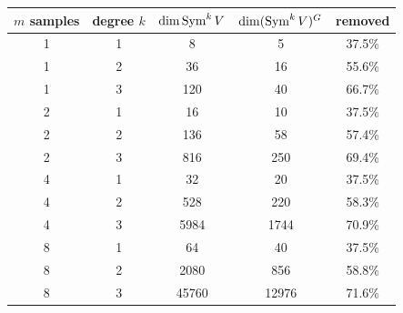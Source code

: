\begin{tabular}{ccccc}
\toprule
$m$ samples & degree $k$ & $\dim\operatorname{Sym}^k V$ & $\dim(\operatorname{Sym}^k V)^G$ & removed \\
\midrule
  1 & 1 & 8 & 5 & 37.5\% \\
  1 & 2 & 36 & 16 & 55.6\% \\
  1 & 3 & 120 & 40 & 66.7\% \\
  2 & 1 & 16 & 10 & 37.5\% \\
  2 & 2 & 136 & 58 & 57.4\% \\
  2 & 3 & 816 & 250 & 69.4\% \\
  4 & 1 & 32 & 20 & 37.5\% \\
  4 & 2 & 528 & 220 & 58.3\% \\
  4 & 3 & 5984 & 1744 & 70.9\% \\
  8 & 1 & 64 & 40 & 37.5\% \\
  8 & 2 & 2080 & 856 & 58.8\% \\
  8 & 3 & 45760 & 12976 & 71.6\% \\
\bottomrule
\end{tabular}